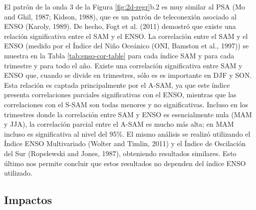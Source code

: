 \documentclass[12pt,oneside]{reedthesis}
\begin{document}
El patrón de la onda 3 de la Figura \ref{fig:2d-regr}b.2 es muy similar al PSA (Mo and Ghil, 1987; Kidson, 1988), que es un patrón de teleconexión asociado al ENSO (Karoly, 1989).
De hecho, Fogt et al. (2011) demostró que existe una relación significativa entre el SAM y el ENSO.
La correlación entre el SAM y el ENSO (medido por el Índice del Niño Oceánico (ONI, Bamston et al., 1997)) se muestra en la Tabla \ref{tab:enso-cor-table} para cada índice SAM y para cada trimestre y para todo el año.
Existe una correlación significativa entre SAM y ENSO que, cuando se divide en trimestres, sólo es es importante en DJF y SON.
Esta relación es captada principalmente por el A-SAM, ya que este índice presenta correlaciones parciales significativas con el ENSO, mientras que las correlaciones con el S-SAM son todas menores y no significativas.
Incluso en los trimestres donde la correlación entre SAM y ENSO es esencialmente nula (MAM y JJA), la correlación parcial entre el A-SAM es mucho más alta; en MAM incluso es significativa al nivel del 95\%.
El mismo análisis se realizó utilizando el Índice ENSO Multivariado (Wolter and Timlin, 2011) y el Índice de Oscilación del Sur (Ropelewski and Jones, 1987), obteniendo resultados similares.
Esto último nos permite concluir que estos resultados no dependen del índice ENSO utilizado.

\hypertarget{impacts}{%
\subsection{Impactos}\label{impacts}}
\end{document}
